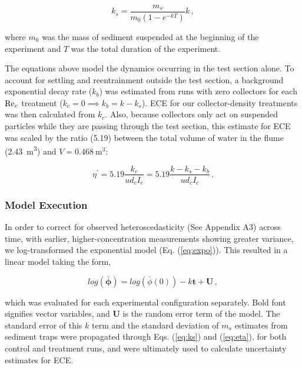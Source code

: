 \documentclass[geosciences,article,submit,moreauthors,pdftex]{Definitions/mdpi}
\begin{document}
\begin{equation}
    k_s = \frac{m_s}{m_0(1-e^{-kT})}k\,,
    \label{eq:ks}
\end{equation}

\noindent where $m_0$ was the mass of sediment suspended at the beginning of the experiment and $T$ was the total duration of the experiment.

The equations above model the dynamics occurring in the test section alone. To account for settling and reentrainment outside the test section, a background exponential decay rate ($k_b$) was estimated from runs with zero collectors for each $\mathrm{Re}_c$ treatment ($k_c = 0 \implies k_b = k - k_s$). ECE for our collector-density treatments was then calculated from $k_c$. Also, because collectors only act on suspended particles while they are passing through the test section, this estimate for ECE was scaled by the ratio (5.19) between the total volume of water in the flume (\SI{2.43}{\metre\cubed}) and $V = \SI{0.468}{\metre\cubed}$:

\begin{equation}
    \eta^\prime = 5.19\frac{k_c}{ud_cI_c} = 5.19\frac{k - k_s - k_b}{ud_cI_c}\,.
    \label{eq:eta}
\end{equation}

\subsubsection{Model Execution}

In order to correct for observed heteroscedasticity (See Appendix A3) across time, with earlier, higher-concentration measurements showing greater variance, we log-transformed the exponential model (Eq. (\ref{eq:expo})). This resulted in a linear model taking the form,

\begin{equation}
    log(\boldsymbol{\bar{\phi}}) = log(\bar{\phi}(0)) - k\boldsymbol{t} + \boldsymbol{U} \,,
\end{equation}

\noindent which was evaluated for each experimental configuration separately. Bold font signifies vector variables, and $\boldsymbol{U}$ is the random error term of the model. The standard error of this $k$ term and the standard deviation of $m_s$ estimates from sediment traps were propagated through Eqs. (\ref{eq:ks}) and (\ref{eq:eta}), for both control and treatment runs, and were ultimately used to calculate uncertainty estimates for ECE.
\end{document}
